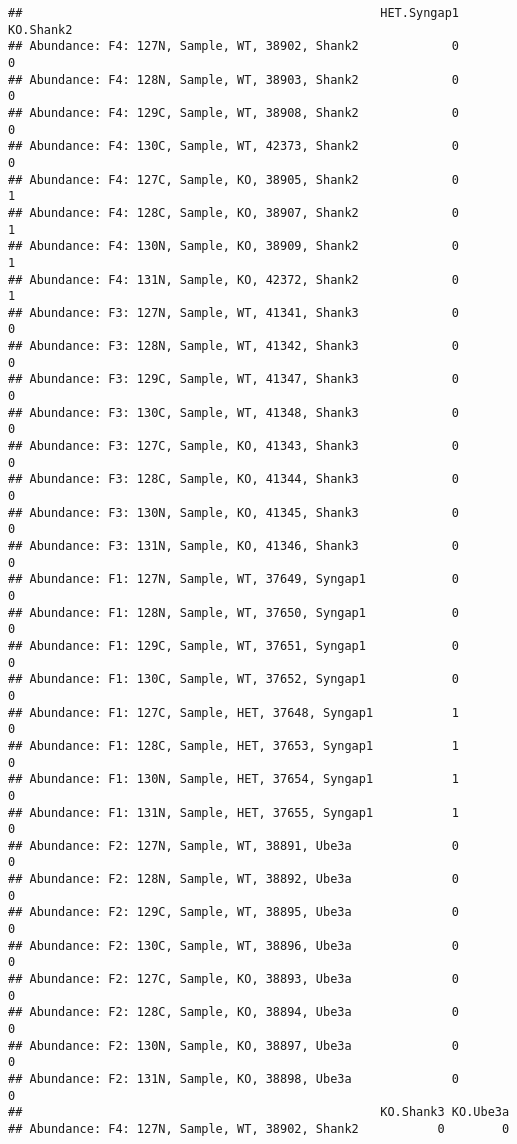 \documentclass[]{article}
\begin{document}
\begin{verbatim}
##                                                  HET.Syngap1 KO.Shank2
## Abundance: F4: 127N, Sample, WT, 38902, Shank2             0         0
## Abundance: F4: 128N, Sample, WT, 38903, Shank2             0         0
## Abundance: F4: 129C, Sample, WT, 38908, Shank2             0         0
## Abundance: F4: 130C, Sample, WT, 42373, Shank2             0         0
## Abundance: F4: 127C, Sample, KO, 38905, Shank2             0         1
## Abundance: F4: 128C, Sample, KO, 38907, Shank2             0         1
## Abundance: F4: 130N, Sample, KO, 38909, Shank2             0         1
## Abundance: F4: 131N, Sample, KO, 42372, Shank2             0         1
## Abundance: F3: 127N, Sample, WT, 41341, Shank3             0         0
## Abundance: F3: 128N, Sample, WT, 41342, Shank3             0         0
## Abundance: F3: 129C, Sample, WT, 41347, Shank3             0         0
## Abundance: F3: 130C, Sample, WT, 41348, Shank3             0         0
## Abundance: F3: 127C, Sample, KO, 41343, Shank3             0         0
## Abundance: F3: 128C, Sample, KO, 41344, Shank3             0         0
## Abundance: F3: 130N, Sample, KO, 41345, Shank3             0         0
## Abundance: F3: 131N, Sample, KO, 41346, Shank3             0         0
## Abundance: F1: 127N, Sample, WT, 37649, Syngap1            0         0
## Abundance: F1: 128N, Sample, WT, 37650, Syngap1            0         0
## Abundance: F1: 129C, Sample, WT, 37651, Syngap1            0         0
## Abundance: F1: 130C, Sample, WT, 37652, Syngap1            0         0
## Abundance: F1: 127C, Sample, HET, 37648, Syngap1           1         0
## Abundance: F1: 128C, Sample, HET, 37653, Syngap1           1         0
## Abundance: F1: 130N, Sample, HET, 37654, Syngap1           1         0
## Abundance: F1: 131N, Sample, HET, 37655, Syngap1           1         0
## Abundance: F2: 127N, Sample, WT, 38891, Ube3a              0         0
## Abundance: F2: 128N, Sample, WT, 38892, Ube3a              0         0
## Abundance: F2: 129C, Sample, WT, 38895, Ube3a              0         0
## Abundance: F2: 130C, Sample, WT, 38896, Ube3a              0         0
## Abundance: F2: 127C, Sample, KO, 38893, Ube3a              0         0
## Abundance: F2: 128C, Sample, KO, 38894, Ube3a              0         0
## Abundance: F2: 130N, Sample, KO, 38897, Ube3a              0         0
## Abundance: F2: 131N, Sample, KO, 38898, Ube3a              0         0
##                                                  KO.Shank3 KO.Ube3a
## Abundance: F4: 127N, Sample, WT, 38902, Shank2           0        0

\end{verbatim}
\end{document}
